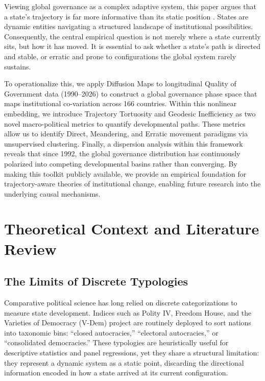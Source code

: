 \documentclass[12pt]{article}
\begin{document}
Viewing global governance as a complex adaptive system, this paper argues that a state's trajectory is far more informative than its static position \cite{miller2007complex, simon1962architecture}. States are dynamic entities navigating a structured landscape of institutional possibilities. Consequently, the central empirical question is not merely where a state currently sits, but how it has moved. It is essential to ask whether a state's path is directed and stable, or erratic and prone to configurations the global system rarely sustains.

To operationalize this, we apply Diffusion Maps to longitudinal Quality of Government data (1990–2026) to construct a global governance phase space that maps institutional co-variation across 166 countries. Within this nonlinear embedding, we introduce Trajectory Tortuosity and Geodesic Inefficiency as two novel macro-political metrics to quantify developmental paths. These metrics allow us to identify Direct, Meandering, and Erratic movement paradigms via unsupervised clustering. Finally, a dispersion analysis within this framework reveals that since 1992, the global governance distribution has continuously polarized into competing developmental basins rather than converging. By making this toolkit publicly available, we provide an empirical foundation for trajectory-aware theories of institutional change, enabling future research into the underlying causal mechanisms.

\section{Theoretical Context and Literature Review}

\subsection{The Limits of Discrete Typologies}
Comparative political science has long relied on discrete categorizations to measure state development. Indices such as Polity IV, Freedom House, and the Varieties of Democracy (V-Dem) project \cite{coppedge2025vdem} are routinely deployed to sort nations into taxonomic bins: ``closed autocracies,'' ``electoral autocracies,'' or ``consolidated democracies.'' These typologies are heuristically useful for descriptive statistics and panel regressions, yet they share a structural limitation: they represent a dynamic system as a static point, discarding the directional information encoded in how a state arrived at its current configuration.
\end{document}
